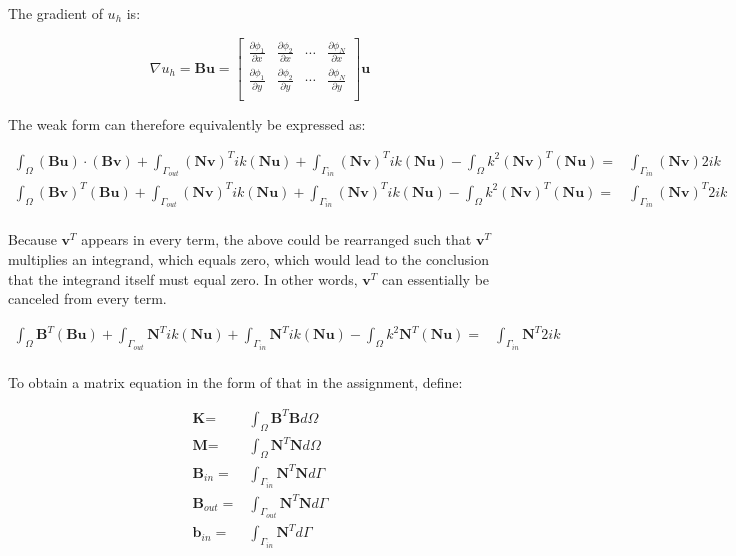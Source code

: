 \documentclass[10pt]{article}
\newcommand{\beq}{\begin{equation}}
\newcommand{\eeq}{\end{equation}}
\newcommand{\beqa}{\begin{equation}\begin{aligned}}
\newcommand{\eeqa}{\end{aligned}\end{equation}}
\begin{document}
The gradient of \(u_h\) is:

\beq
\nabla u_h=\textbf{B}\textbf{u}=\begin{bmatrix} 
\frac{\partial \phi_1}{\partial x} & \frac{\partial \phi_2}{\partial x} & \cdots & \frac{\partial \phi_N}{\partial x}\\
\frac{\partial \phi_1}{\partial y} & \frac{\partial \phi_2}{\partial y} & \cdots & \frac{\partial \phi_N}{\partial y}\\
\end{bmatrix}\textbf{u}
\eeq

The weak form can therefore equivalently be expressed as:

\beqa
\int_{\Omega}(\textbf{B}\textbf{u})\cdot(\textbf{B}\textbf{v})+\int_{\Gamma_{out}}(\textbf{N}\textbf{v})^Tik(\textbf{N}\textbf{u})+\int_{\Gamma_{in}}(\textbf{N}\textbf{v})^Tik(\textbf{N}\textbf{u})-\int_{\Omega}k^2(\textbf{N}\textbf{v})^T(\textbf{N}\textbf{u})=&\int_{\Gamma_{in}}(\textbf{N}\textbf{v})2ik\\
\int_{\Omega}(\textbf{B}\textbf{v})^T(\textbf{B}\textbf{u})+\int_{\Gamma_{out}}(\textbf{N}\textbf{v})^Tik(\textbf{N}\textbf{u})+\int_{\Gamma_{in}}(\textbf{N}\textbf{v})^Tik(\textbf{N}\textbf{u})-\int_{\Omega}k^2(\textbf{N}\textbf{v})^T(\textbf{N}\textbf{u})=&\int_{\Gamma_{in}}(\textbf{N}\textbf{v})^T2ik\\
\eeqa

Because \(\textbf{v}^T\) appears in every term, the above could be rearranged such that \(\textbf{v}^T\) multiplies an integrand, which equals zero, which would lead to the conclusion that the integrand itself must equal zero. In other words, \(\textbf{v}^T\) can essentially be canceled from every term.

\beqa
\int_{\Omega}\textbf{B}^T(\textbf{B}\textbf{u})+\int_{\Gamma_{out}}\textbf{N}^Tik(\textbf{N}\textbf{u})+\int_{\Gamma_{in}}\textbf{N}^Tik(\textbf{N}\textbf{u})-\int_{\Omega}k^2\textbf{N}^T(\textbf{N}\textbf{u})=&\int_{\Gamma_{in}}\textbf{N}^T2ik\\
\eeqa

To obtain a matrix equation in the form of that in the assignment, define:

\beqa
\label{eq:Matrices}
\textbf{K}=&\int_{\Omega}\textbf{B}^T\textbf{B}d\Omega\\
\textbf{M}=&\int_{\Omega}\textbf{N}^T\textbf{N}d\Omega\\
\textbf{B}_{in}=&\int_{\Gamma_{in}}\textbf{N}^T\textbf{N}d\Gamma\\
\textbf{B}_{out}=&\int_{\Gamma_{out}}\textbf{N}^T\textbf{N}d\Gamma\\
\textbf{b}_{in}=&\int_{\Gamma_{in}}\textbf{N}^Td\Gamma\\
\eeqa
\end{document}
